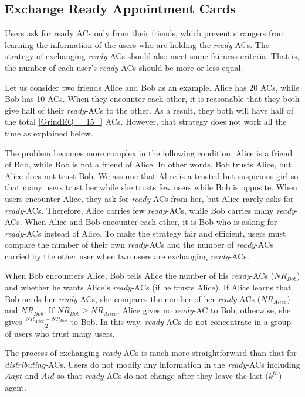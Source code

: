 \subsection{ Exchange Ready Appointment Cards}

\noindent Users ask for ready ACs only from their friends, which prevent strangers from learning the information of the users who are holding the \textit{ready}-ACs. The strategy of exchanging \textit{ready}-ACs should also meet some fairness criteria. That is, the number of each user's \textit{ready}-ACs should be more or less equal. 

Let us consider two friends Alice and Bob as an example. Alice has 20 ACs, while Bob has 10 ACs. When they encounter each other, it is reasonable that they both give half of their \textit{ready}-ACs to the other. As a result, they both will have half of the total \eqref{GrindEQ__15_} ACs. However, that strategy does not work all the time as explained below.

The problem becomes more complex in the following condition. Alice is a friend of Bob, while Bob is not a friend of Alice. In other words, Bob trusts Alice, but Alice does not trust Bob. We assume that Alice is a trusted but suspicious girl so that many users trust her while she trusts few users while Bob is opposite. When users encounter Alice, they ask for \textit{ready}-ACs from her, but Alice rarely asks for \textit{ready}-ACs. Therefore, Alice carries few \textit{ready}-ACs, while Bob carries many \textit{ready}-ACs. When Alice and Bob encounter each other, it is Bob who is asking for \textit{ready}-ACs instead of Alice. To make the strategy fair and efficient, users must compare the number of their own \textit{ready}-ACs and the number of \textit{ready}-ACs carried by the other user when two users are exchanging \textit{ready}-ACs.

When Bob encounters Alice, Bob tells Alice the number of his \textit{ready}-ACs (${NR}_{Bob}$) and whether he wants Alice's \textit{ready}-ACs (if he trusts Alice). If Alice learns that Bob needs her \textit{ready}-ACs, she compares the number of her \textit{ready}-ACs (${NR}_{Alice}$) and ${NR}_{Bob}$. If ${NR}_{Bob}\ge {NR}_{Alice}$, Alice gives no \textit{ready}-AC to Bob; otherwise, she gives $\frac{{NR}_{Alice}-{NR}_{Bob}}{2}$ to Bob. In this way, \textit{ready}-ACs do not concentrate in a group of users who trust many users. 

The process of exchanging \textit{ready}-ACs is much more straightforward than that for \textit{distributing}-ACs. Users do not modify any information in the \textit{ready}-ACs including $Aapt$ and $Aid$ so that \textit{ready}-ACs do not change after they leave the last ($k^{th}$) agent.

